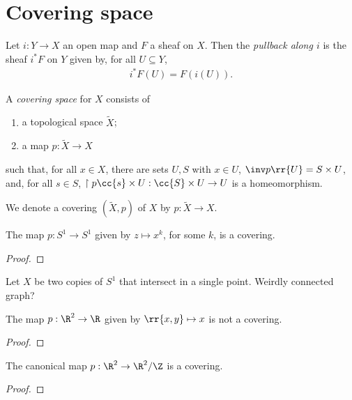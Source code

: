 \documentclass{article}
\begin{document}
\section{Covering space}\label{sec:covering_space}

\begin{definition}
  Let $i:Y\to X$ an open map and $F$ a sheaf on $X$. Then
  the \emph{pullback along $i$} is the sheaf $i^*F$ on $Y$
  given by, for all $U\subseteq Y$,
  \begin{align*}
    i^*F(U) = F(i(U)).
  \end{align*}
\end{definition}



\begin{definition}
  A \emph{covering space} for $X$ consists of
  \begin{enumerate}
    \item a topological space $\tilde X$;
    \item a map $p:\tilde X\to X$
  \end{enumerate}
  such that, for all $x\in X$, there are sets $U,S$ with $x\in U$, $\inv p\rr{U}=S\times U$,
  and, for all $s\in S$, $\restriction{p}{\cc{s}\times U}:\cc{S}\times U\to U$ is a
  homeomorphism.
\end{definition}

\begin{notation}
  We denote a covering $(\tilde X,p)$ of $X$ by $p:\tilde X\to X$.
\end{notation}

\begin{example}
  The map $p:S^1\to S^1$ given by $z\mapsto x^k$, for some $k$, is a covering.
  \begin{proof}
    \missingproof
  \end{proof}
\end{example}

\begin{example}
  Let $X$ be two copies of $S^1$ that intersect in a single point. Weirdly connected
  graph?
\end{example}

\begin{example}
  The map $p:\R^2\to\R$ given by $\rr{x,y}\mapsto x$ is not a covering.
  \begin{proof}
    \missingproof
  \end{proof}
\end{example}

\begin{example}
  The canonical map $p:\R^2\to\R^2/\Z$ is a covering.
  \begin{proof}
    \missingproof
  \end{proof}
\end{example}
\end{document}
